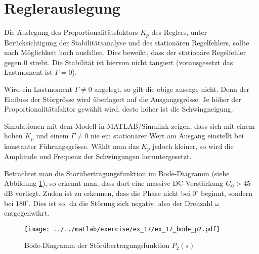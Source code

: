 \section{Reglerauslegung}
Die Auslegung des Proportionalitätsfaktors $K_p$ des Reglers, unter
Berücksichtigung der Stabilitätsanalyse und des stationären Regelfehlers,
sollte nach Möglichkeit hoch ausfallen. Dies beweikt, dass der stationäre
Regelfehler gegen 0 strebt. Die Stabilität ist hiervon nicht tangiert
(vorausgesetzt das Lastmoment ist $\Gamma = 0$).

Wird ein Lastmoment $\Gamma \neq 0$ angelegt, so gilt die obige aussage
nicht. Denn der Einfluss der Störgrösse wird überlagert auf die
Ausgangsgrösse. Je höher der Proportionalitätsfaktor gewählt wird, desto
höher ist die Schwingneigung. 

Simulationen mit dem Modell in MATLAB/Simulink zeigen, dass sich mit einem
hohen $K_p$ und einem $\Gamma \neq 0$ nie ein stationärer Wert am Ausgang
einstellt bei konstanter Führungsgrösse. Wählt man das $K_p$ jedoch kleiner,
so wird die Amplitude und Frequenz der Schwingungen heruntergesetzt.

Betrachtet man die Störübertragungsfunktion im Bode-Diagramm (siehe Abbildung
\ref{fig:ex_17_bode_p2}), so erkennt man, dass dort eine massive
DC-Verstärkung $G_0 > 45$dB vorliegt. Zuden ist zu erkennen, dass die
Phase nicht bei $0^{\circ}$ beginnt, sondern bei $180^{\circ}$. Dies ist so,
da die Störung sich negativ, also der Drehzahl $\omega$ entgegenwikrt.

\begin{figure}[h!]
	\centering
	\texttt{[image: ../../matlab/exercise/ex\_17/ex\_17\_bode\_p2.pdf]}
	\caption{Bode-Diagramm der Störübertragungsfunktion $P_2(s)$}
	\label{fig:ex_17_bode_p2}
\end{figure}
